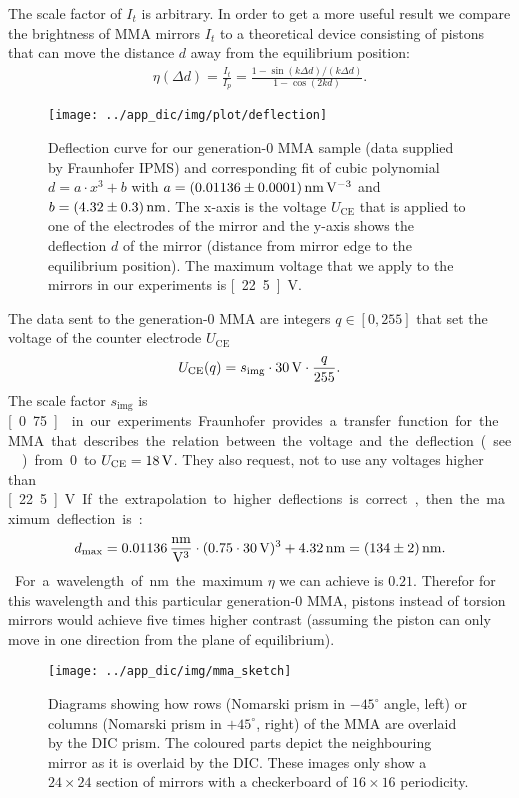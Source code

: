 The scale factor of $I_t$ is arbitrary. In order to get a more useful
result we compare the brightness of MMA mirrors $I_t$ to a theoretical
device consisting of pistons that can move the distance $d$ away from
the equilibrium position:
\begin{align}
\label{eqn:eta}
  \eta(\Delta d)=\frac{I_t}{I_p}=\frac{1-\sin(k\Delta d)/(k\Delta d)}{1-\cos(2kd)}.
\end{align}
\begin{figure}[ht]
  \centering
  \texttt{[image: ../app\_dic/img/plot/deflection]}
  \caption{Deflection curve for our generation-0 MMA sample (data
    supplied by Fraunhofer IPMS) and corresponding fit of cubic
    polynomial $d=a\cdot x^3+b$ with $a=\unit[(0.01136\pm0.0001)]{nm\,
      V^{-3}}$ and $b=\unit[(4.32\pm0.3)]{nm}$. The x-axis is the
    voltage $U_\textrm{CE}$ that is applied to one of the electrodes
    of the mirror and the y-axis shows the deflection $d$ of the
    mirror (distance from mirror edge to the equilibrium
    position). The maximum voltage that we apply to the mirrors in our
    experiments is \unit[22.5]{V}.}
  \label{fig:deflection}
\end{figure}
The data sent to the generation-0 MMA are integers $q\in[0,255]$
that set the voltage of the counter electrode $U_\textrm{CE}$
\begin{align}
U_\textrm{CE}(q)=s_\textrm{img}\cdot \unit[30]{V} \cdot \frac{q}{255}.
\end{align}
The scale factor $s_\textrm{img}$ is \unit[0.75]{} in our experiments.
Fraunhofer provides a transfer function for the MMA that describes the
relation between the voltage and the deflection (see
) from 0 to $U_\textrm{CE}=\unit[18]{V}$. They
also request, not to use any voltages higher than \unit[22.5]{V}. If
the extrapolation to higher deflections is correct, then the maximum
deflection is: %
\begin{align}
\label{eqn:dmax}
d_\textrm{max}=\unit[0.01136]{\frac{nm}{V^3}}\cdot(0.75\cdot\unit[30]{V})^3+\unit[4.32]{nm}
=\unit[(134\pm2)]{nm}.
\end{align}
For a wavelength of \unit[480]{nm} the maximum $\eta$ we can achieve
is $0.21$. Therefor for this wavelength and this particular
generation-0 MMA, pistons instead of torsion mirrors would achieve
five times higher contrast (assuming the piston can only move in one
direction from the plane of equilibrium).
\begin{figure}[ht]
  \centering
  \texttt{[image: ../app\_dic/img/mma\_sketch]}
  \caption{ Diagrams showing how rows (Nomarski prism in $-45^\circ$
    angle, left) or columns (Nomarski prism in $+45^\circ$, right) of
    the MMA are overlaid by the DIC prism. The coloured parts depict
    the neighbouring mirror as it is overlaid by the DIC. These
    images only show a $24\times 24$ section of mirrors with a
    checkerboard of $16\times 16$ periodicity.}
  \label{fig:screen}
\end{figure}
